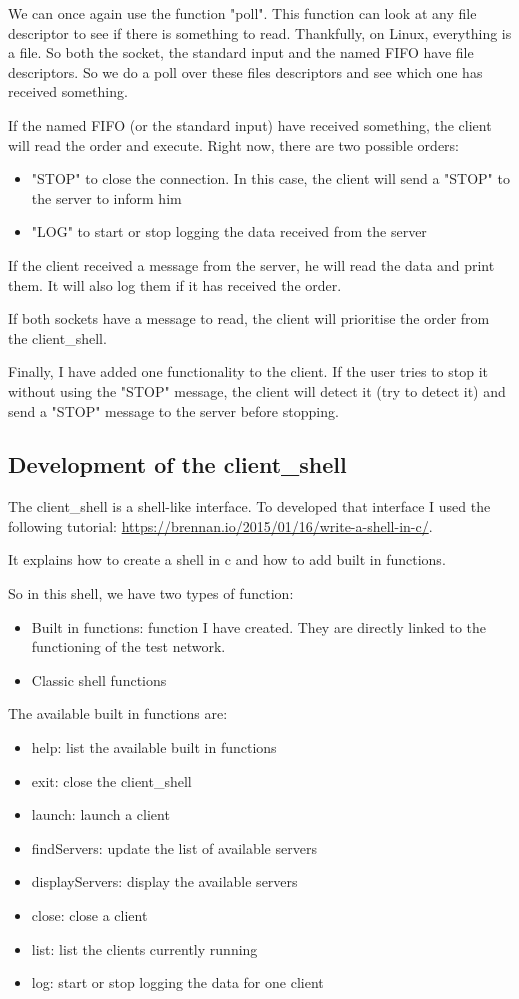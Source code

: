 We can once again use the function "poll". This function can look at any file descriptor to see if there is something to read. Thankfully, on Linux, everything is a file. So both the socket, the standard input and the named FIFO have file descriptors.
So we do a poll over these files descriptors and see which one has received something.

If the named FIFO (or the standard input) have received something, the client will read the order and execute. Right now, there are two possible orders:
\begin{itemize}
	\item "STOP" to close the connection. In this case, the client will send a "STOP" to the server to inform him
	\item "LOG" to start or stop logging the data received from the server
\end{itemize}

If the client received a message from the server, he will read the data and print them. It will also log them if it has received the order.

If both sockets have a message to read, the client will prioritise the order from the client\_shell.


Finally, I have added one functionality to the client. If the user tries to stop it without using the "STOP" message, the client will detect it (try to detect it) and send a "STOP" message to the server before stopping.


\subsection{Development of the client\_shell}

The client\_shell is a shell-like interface. To developed that interface I used the following tutorial: \url{https://brennan.io/2015/01/16/write-a-shell-in-c/}.

It explains how to create a shell in c and how to add built in functions.

So in this shell, we have two types of function:
\begin{itemize}
	\item Built in functions: function I have created. They are directly linked to the functioning of the test network.
	\item Classic shell functions
\end{itemize}

The available built in functions are:
\begin{itemize}
	\item help: list the available built in functions
	\item exit: close the client\_shell
	\item launch: launch a client
	\item findServers: update the list of available servers
	\item displayServers: display the available servers
	\item close: close a client
	\item list: list the clients currently running 
	\item log: start or stop logging the data for one client
\end{itemize}

